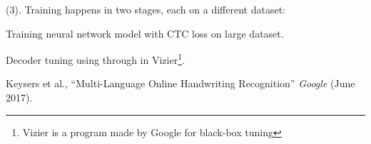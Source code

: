 \documentclass[11pt]{article}
\begin{document}
 (3). Training happens in two stages, each on a different dataset:
\begin{compactenum}
	\item Training neural network model with CTC loss on large dataset.
	
	\item Decoder tuning using  through  in Vizier\footnote{Vizier is a  program made by Google for black-box tuning}.
\end{compactenum}




\vspace{-1em}
{\footnotesize Keysers et al., ``Multi-Language Online Handwriting Recognition'' \textit{Google} (June 2017).}
\end{document}
